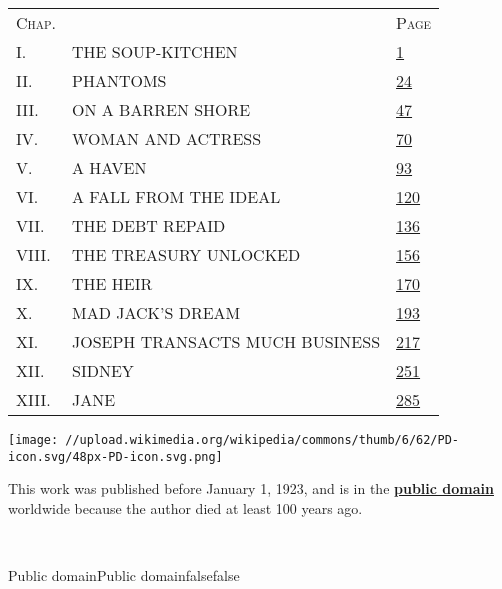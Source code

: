 \begin{longtable}[]{@{}lll@{}}
\toprule
\textsc{Chap.} & & \textsc{Page}\tabularnewline
I. & THE SOUP-KITCHEN &
\href{/wiki/The_Nether_World/Volume_3/Chapter_1\#1}{1}\tabularnewline
II. & PHANTOMS &
\href{/wiki/The_Nether_World/Volume_3/Chapter_2\#24}{24}\tabularnewline
III. & ON A BARREN SHORE &
\href{/wiki/The_Nether_World/Volume_3/Chapter_3\#47}{47}\tabularnewline
IV. & WOMAN AND ACTRESS &
\href{/wiki/The_Nether_World/Volume_3/Chapter_4\#70}{70}\tabularnewline
V. & A HAVEN &
\href{/wiki/The_Nether_World/Volume_3/Chapter_5\#93}{93}\tabularnewline
VI. & A FALL FROM THE IDEAL &
\href{/wiki/The_Nether_World/Volume_3/Chapter_6\#120}{120}\tabularnewline
VII. & THE DEBT REPAID &
\href{/wiki/The_Nether_World/Volume_3/Chapter_7\#136}{136}\tabularnewline
VIII. & THE TREASURY UNLOCKED &
\href{/wiki/The_Nether_World/Volume_3/Chapter_8\#156}{156}\tabularnewline
IX. & THE HEIR &
\href{/wiki/The_Nether_World/Volume_3/Chapter_9\#170}{170}\tabularnewline
X. & MAD JACK'S DREAM &
\href{/wiki/The_Nether_World/Volume_3/Chapter_10\#193}{193}\tabularnewline
XI. & JOSEPH TRANSACTS MUCH BUSINESS &
\href{/wiki/The_Nether_World/Volume_3/Chapter_11\#217}{217}\tabularnewline
XII. & SIDNEY &
\href{/wiki/The_Nether_World/Volume_3/Chapter_12\#251}{251}\tabularnewline
XIII. & JANE &
\href{/wiki/The_Nether_World/Volume_3/Chapter_13\#285}{285}\tabularnewline
\bottomrule
\end{longtable}

\protect\hypertarget{imageLeft}{}{\texttt{[image: //upload.wikimedia.org/wikipedia/commons/thumb/6/62/PD-icon.svg/48px-PD-icon.svg.png]}}

\hypertarget{licFrame-centertext}{}
This work was published before January 1, 1923, and is in the
\textbf{\href{https://en.wikipedia.org/wiki/Public_domain}{public
domain}} worldwide because the author died at least 100 years ago.

\protect\hypertarget{noimageRight}{}{~}

{Public domain}{Public domain}{false}{false}
